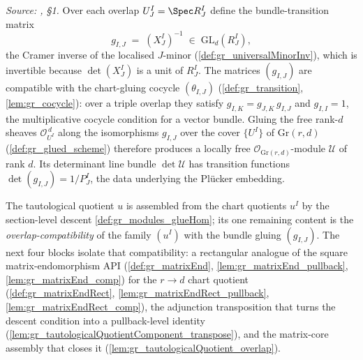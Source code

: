 \begin{definition}\leanok
  \label{def:gr_universal_quotient_sheaf}
  \textit{Source: \cite{nitsure-hilbert-quot}, \S 1.}
  Over each overlap \(U^I_J = \Spec R^I_J\) define the bundle-transition matrix
  \[
    g_{I,J} \;=\; (X^I_J)^{-1} \;\in\; \mathrm{GL}_d(R^I_J),
  \]
  the Cramer inverse of the localised \(J\)-minor (\cref{def:gr_universalMinorInv}),
  which is invertible because \(\det(X^I_J)\) is a unit of \(R^I_J\). The matrices
  \((g_{I,J})\) are compatible with the chart-gluing cocycle \((\theta_{I,J})\)
  (\cref{def:gr_transition}, \cref{lem:gr_cocycle}): over a triple overlap they
  satisfy \(g_{I,K} = g_{J,K}\, g_{I,J}\) and \(g_{I,I} = 1\), the multiplicative
  cocycle condition for a vector bundle. Gluing the free rank-\(d\) sheaves
  \(\mathcal{O}_{U^I}^{\,d}\) along the isomorphisms \(g_{I,J}\) over the cover
  \(\{U^I\}\) of \(\mathrm{Gr}(r,d)\) (\cref{def:gr_glued_scheme}) therefore
  produces a locally free \(\mathcal{O}_{\mathrm{Gr}(r,d)}\)-module
  \(\mathcal{U}\) of rank \(d\). Its determinant line bundle \(\det \mathcal{U}\)
  has transition functions \(\det(g_{I,J}) = 1/P^I_J\), the data underlying the
  Pl\"ucker embedding.
\end{definition}

The tautological quotient \(u\) is assembled from the chart quotients \(u^I\) by the
section-level descent \cref{def:gr_modules_glueHom}; its one remaining content is the
\emph{overlap-compatibility} of the family \((u^I)\) with the bundle gluing
\((g_{I,J})\). The next four blocks isolate that compatibility: a rectangular analogue of
the square matrix-endomorphism API (\cref{def:gr_matrixEnd},
\cref{lem:gr_matrixEnd_pullback}, \cref{lem:gr_matrixEnd_comp}) for the
\(r \to d\) chart quotient (\cref{def:gr_matrixEndRect},
\cref{lem:gr_matrixEndRect_pullback}, \cref{lem:gr_matrixEndRect_comp}), the
adjunction transposition that turns the descent condition into a pullback-level identity
(\cref{lem:gr_tautologicalQuotientComponent_transpose}), and the matrix-core assembly
that closes it (\cref{lem:gr_tautologicalQuotient_overlap}).

